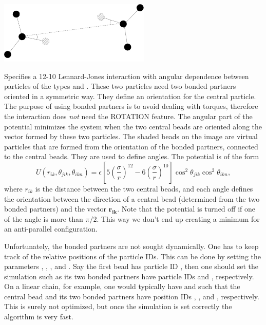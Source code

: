 \begin{center}
  \includegraphics[height=8em]{figures/hbond}
\end{center}

Specifies a 12-10 Lennard-Jones interaction with angular dependence between
particles of the types  and . These two particles need
two bonded partners oriented in a symmetric way. They define an orientation
for the central particle. The purpose of using bonded partners is to avoid
dealing with torques, therefore the interaction does \emph{not} need the
ROTATION feature. The angular part of the potential minimizes the system when
the two central beads are oriented along the vector formed by these two
particles. The shaded beads on the image are virtual particles that are formed
from the orientation of the bonded partners, connected to the central
beads. They are used to define angles. The potential is of the form
\begin{equation}
  U(r_{ik},\theta_{jik},\theta_{ikn})=
  \epsilon\left[5\left(\frac{\sigma}r\right)^{12} - 
    6\left(\frac{\sigma}{r}\right)^{10}\right]
  \cos^2\theta_{jik}\cos^2\theta_{ikn},
\end{equation}
where $r_{ik}$ is the distance between the two central beads, and each angle
defines the orientation between the direction of a central bead (determined
from the two bonded partners) and the vector $\mathbf{r_{ik}}$. Note that the
potential is turned off if one of the angle is more than $\pi/2$. This way we
don't end up creating a minimum for an anti-parallel configuration.

Unfortunately, the bonded partners are not sought dynamically. One has to keep
track of the relative positions of the particle IDs. This can be done by
setting the parameters , , , and . Say
the first bead  has particle ID , then one should set the
simulation such as its two bonded partners have particle IDs  and
, respectively. On a linear chain, for example, one would
typically have  and  such that the central bead and
its two bonded partners have position IDs , , and ,
respectively. This is surely not optimized, but once the simulation is set
correctly the algorithm is very fast.

